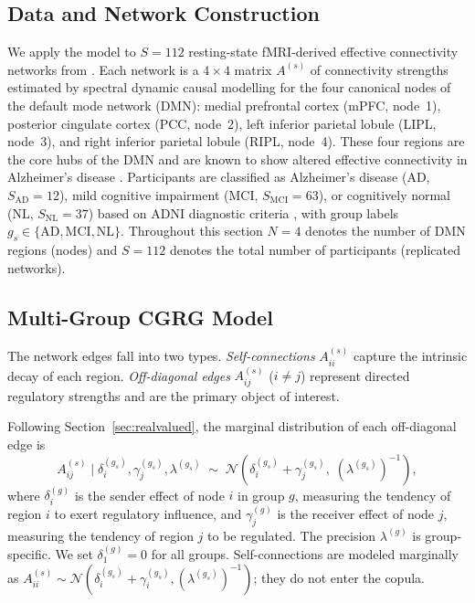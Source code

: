 \documentclass[12pt]{article}
\begin{document}
\subsection{Data and Network Construction}

We apply the model to $S = 112$ resting-state fMRI-derived effective
connectivity networks from \citet{nie2020}.  Each network is a $4 \times 4$
matrix $A^{(s)}$ of connectivity strengths estimated by spectral dynamic
causal modelling \citep{friston2014} for the four canonical nodes of the
default mode network (DMN): medial prefrontal cortex (mPFC, node~1),
posterior cingulate cortex (PCC, node~2), left inferior parietal lobule
(LIPL, node~3), and right inferior parietal lobule (RIPL, node~4).
These four regions are the core hubs of the DMN and are known to show
altered effective connectivity in Alzheimer's disease
\citep{dmn2016, huang2022, monash2024}.
Participants are classified as Alzheimer's disease (AD, $S_{\mathrm{AD}} = 12$),
mild cognitive impairment (MCI, $S_{\mathrm{MCI}} = 63$), or cognitively normal
(NL, $S_{\mathrm{NL}} = 37$) based on ADNI diagnostic criteria \citep{ma2019},
with group labels $g_s \in \{\mathrm{AD}, \mathrm{MCI}, \mathrm{NL}\}$.
Throughout this section $N = 4$ denotes the number of DMN regions (nodes) and
$S = 112$ denotes the total number of participants (replicated networks).

\subsection{Multi-Group CGRG Model}

The network edges fall into two types.  \emph{Self-connections}
$A^{(s)}_{ii}$ capture the intrinsic decay of each region.  \emph{Off-diagonal
edges} $A^{(s)}_{ij}$ ($i \neq j$) represent directed regulatory strengths and
are the primary object of interest.

Following Section~\ref{sec:realvalued}, the marginal distribution of each
off-diagonal edge is
\begin{equation}
\label{eq:brain_marginal}
A^{(s)}_{ij} \mid \delta_i^{(g_s)}, \gamma_j^{(g_s)}, \lambda^{(g_s)}
  \;\sim\; \mathcal{N}\!\left(\delta_i^{(g_s)} + \gamma_j^{(g_s)},\;
    (\lambda^{(g_s)})^{-1}\right),
\end{equation}
where $\delta_i^{(g)}$ is the sender effect of node $i$ in group $g$,
measuring the tendency of region $i$ to exert regulatory influence, and
$\gamma_j^{(g)}$ is the receiver effect of node $j$, measuring the
tendency of region $j$ to be regulated.  The precision $\lambda^{(g)}$ is
group-specific.  We set $\delta_1^{(g)} = 0$ for all groups.  Self-connections
are modeled marginally as $A^{(s)}_{ii} \sim \mathcal{N}(\delta_i^{(g_s)} +
\gamma_i^{(g_s)}, (\lambda^{(g_s)})^{-1})$; they do not enter the copula.
\end{document}
